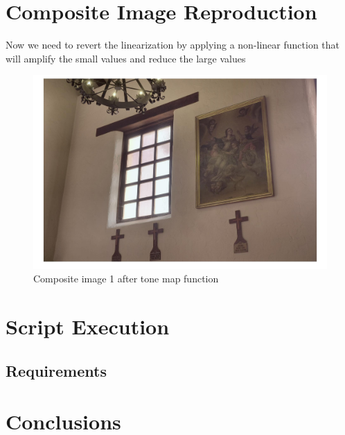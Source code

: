 \documentclass[a4paper]{article}
\begin{document}
\section{Composite Image Reproduction}
Now we need to revert the linearization by applying a non-linear function that will amplify the small values and reduce the large values
\begin{figure}[htb!]
    \begin{center}
        \includegraphics[width=6 in]{chapelLDR.jpg}
	 \end{center}
    \caption{Composite image 1 after tone map function} 
    \label{fig:LDR1}
\end{figure}
\FloatBarrier

\section{Script Execution}

\subsection{Requirements}
\section{Conclusions}


\end{document}
